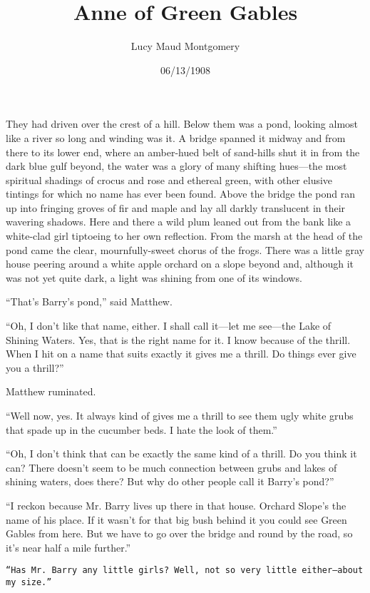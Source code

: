 \documentclass[a4paper]{article}
\title{Anne of Green Gables}
\author{Lucy Maud Montgomery}
\date{06/13/1908}
\begin{document}
\maketitle

\textsf{They had driven over the crest of a hill. Below them was a pond, looking almost like a river so long and winding was it. A bridge spanned it midway and from there to its lower end, where an amber-hued belt of sand-hills shut it in from the dark blue gulf beyond, the water was a glory of many shifting hues---the most spiritual shadings of crocus and rose and ethereal green, with other elusive tintings for which no name has ever been found. Above the bridge the pond ran up into fringing groves of fir and maple and lay all darkly translucent in their wavering shadows. Here and there a wild plum leaned out from the bank like a white-clad girl tiptoeing to her own reflection. From the marsh at the head of the pond came the clear, mournfully-sweet chorus of the frogs. There was a little gray house peering around a white apple orchard on a slope beyond and, although it was not yet quite dark, a light was shining from one of its windows.}

\textsf{``That's Barry's pond,'' said Matthew.}

\textsf{``Oh, I don't like that name, either. I shall call it---let me see---the Lake of Shining Waters. Yes, that is the right name for it. I know because of the thrill. When I hit on a name that suits exactly it gives me a thrill. Do things ever give you a thrill?''}

\textrm{Matthew ruminated.}

\textrm{``Well now, yes. It always kind of gives me a thrill to see them ugly white grubs that spade up in the cucumber beds. I hate the look of them.''}

\textrm{``Oh, I don't think that can be exactly the same kind of a thrill. Do you think it can? There doesn't seem to be much connection between grubs and lakes of shining waters, does there? But why do other people call it Barry's pond?''}

\textrm{``I reckon because Mr. Barry lives up there in that house. Orchard Slope's the name of his place. If it wasn't for that big bush behind it you could see Green Gables from here. But we have to go over the bridge and round by the road, so it's near half a mile further.''}

\texttt{``Has Mr. Barry any little girls? Well, not so very little either---about my size.''}
\end{document}
